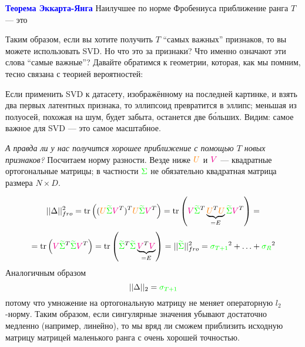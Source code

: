 \documentclass{amsart}
\theoremstyle{definition}
\theoremstyle{remark}
\numberwithin{equation}{section}
\begin{document}
\textbf{\textcolor{blue}{Теорема Эккарта-Янга}} Наилучшее по норме Фробениуса приближение ранга $T$ --- это 

\begin{center}
\end{center}

Таким образом, если вы хотите получить $T$ ``самых важных'' признаков, то вы можете использовать SVD. Но что это за признаки? Что именно означают эти слова ``самые важные''? Давайте обратимся к геометрии, которая, как мы помним, тесно связана с теорией вероятностей:

\begin{center}
\end{center}

\begin{center}
\end{center}

Если применить SVD к датасету, изображённому на последней картинке, и взять два первых латентных признака, то эллипсоид превратится в эллипс; меньшая из полуосей, похожая на шум, будет забыта, останется две б\'{о}льших. Видим: самое важное для SVD --- это самое масштабное.

\medskip

\textit{А правда ли у нас получится хорошее приближение с помощью $T$ новых признаков?} Посчитаем норму разности. Везде ниже $\textcolor{orange}{U}$ и $\textcolor{magenta}{V}$ --- квадратные ортогональные матрицы; в частности $\textcolor{green}{\Sigma}$ не обязательно квадратная матрица размера $N\times D$.

\begin{center}
\end{center}

$$||\Delta||_{fro}^2 = \mathrm{tr}\left((\textcolor{orange}{U}\textcolor{green}{\widetilde{\Sigma}}\textcolor{magenta}{V}^T)^T\textcolor{orange}{U}\textcolor{green}{\widetilde{\Sigma}}\textcolor{magenta}{V}^T\right) = 
\mathrm{tr}\left(\textcolor{magenta}{V}\textcolor{green}{\widetilde{\Sigma}}^T\underbrace{\textcolor{orange}{U}^T\textcolor{orange}{U}}_{=E}\textcolor{green}{\widetilde{\Sigma}}\textcolor{magenta}{V}^T\right) =$$
$$=\mathrm{tr}\left(\textcolor{magenta}{V}\textcolor{green}{\widetilde{\Sigma}}^T\textcolor{green}{\widetilde{\Sigma}}\textcolor{magenta}{V}^T\right) = \mathrm{tr}\left(\textcolor{green}{\widetilde{\Sigma}}^T\textcolor{green}{\widetilde{\Sigma}}\underbrace{\textcolor{magenta}{V}^T\textcolor{magenta}{V}}_{=E}\right) = ||\textcolor{green}{\widetilde{\Sigma}}||^2_{fro} = \textcolor{green}{\sigma_{T+1}}^2 + \ldots + \textcolor{green}{\sigma_{R}}^2$$
Аналогичным образом
$$||\Delta||_2 = \textcolor{green}{\sigma_{T+1}}$$
потому что умножение на ортогональную матрицу не меняет операторную $l_2$-норму. Таким образом, если сингулярные значения убывают достаточно медленно (например, линейно), то мы вряд ли сможем приблизить исходную матрицу матрицей маленького ранга с очень хорошей точностью.
\end{document}
